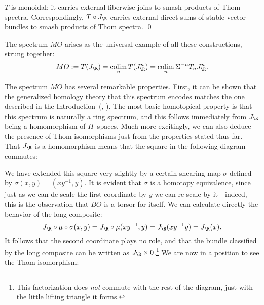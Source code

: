 \begin{lemma}\label{ThomSpacesAreMonoidal}
\(T\) is monoidal: it carries external fiberwise joins to smash products of Thom spectra.  Correspondingly, \(T \circ J_{\R}\) carries external direct sums of stable vector bundles to smash products of Thom spectra. \qed
\end{lemma}

\begin{definition}\label{DefnOfMO}
The spectrum \(MO\) arises as the universal example of all these constructions, strung together:
\[MO := T(J_{\R}) = \colim_n T(J_{\R}^n) = \colim_n \Susp^{-n} T_n J_{\R}^n.\]
\end{definition}

The spectrum \(MO\) has several remarkable properties.  First, it can be shown that the generalized homology theory that this spectrum encodes matches the one described in the Introduction~(\cite[Theorem 12.30]{Switzer}, \cite[Theorem 7.27]{Rudyak}).  The most basic homotopical property is that this spectrum is naturally a ring spectrum, and this follows immediately from \(J_{\R}\) being a homomorphism of \(H\)--spaces.  Much more excitingly, we can also deduce the presence of Thom isomorphisms just from the properties stated thus far.  That \(J_{\R}\) is a homomorphism means that the square in the following diagram commutes:
\begin{center}
\end{center}
We have extended this square very slightly by a certain shearing map \(\sigma\) defined by \(\sigma(x, y) = (xy^{-1}, y)\).  It is evident that \(\sigma\) is a homotopy equivalence, since just as we can de-scale the first coordinate by \(y\) we can re-scale by it---indeed, this is the observation that \(BO\) is a torsor for itself.  We can calculate directly the behavior of the long composite: \[J_{\R} \circ \mu \circ \sigma(x, y) = J_{\R} \circ \mu(xy^{-1}, y) = J_{\R}(xy^{-1}y) = J_{\R}(x).\]  It follows that the second coordinate plays no role, and that the bundle classified by the long composite can be written as \(J_{\R} \times 0\).\footnote{This factorization does \emph{not} commute with the rest of the diagram, just with the little lifting triangle it forms.}  We are now in a position to see the Thom isomorphism:

